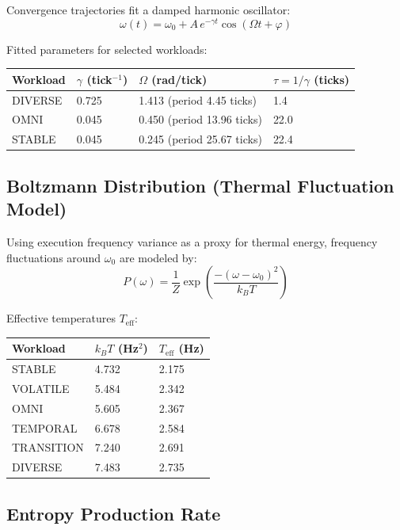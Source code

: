 Convergence trajectories fit a damped harmonic oscillator:
\[
  \omega(t) = \omega_0 + A\,e^{-\gamma t}\cos(\Omega t + \varphi)
\]

Fitted parameters for selected workloads:

\begin{center}
\begin{tabular}{llll}
\toprule
Workload & $\gamma$ (tick$^{-1}$) & $\Omega$ (rad/tick) & $\tau = 1/\gamma$ (ticks) \\
\midrule
DIVERSE & 0.725 & 1.413 (period 4.45 ticks) & 1.4 \\
OMNI    & 0.045 & 0.450 (period 13.96 ticks) & 22.0 \\
STABLE  & 0.045 & 0.245 (period 25.67 ticks) & 22.4 \\
\bottomrule
\end{tabular}
\end{center}

\subsection{Boltzmann Distribution (Thermal Fluctuation Model)}

Using execution frequency variance as a proxy for thermal energy,
frequency fluctuations around $\omega_0$ are modeled by:
\[
  P(\omega) = \frac{1}{Z}\exp\!\left(\frac{-(\omega-\omega_0)^2}{k_B T}\right)
\]

Effective temperatures $T_\text{eff}$:

\begin{center}
\begin{tabular}{lll}
\toprule
Workload    & $k_B T$ (Hz$^2$) & $T_\text{eff}$ (Hz) \\
\midrule
STABLE      & 4.732 & 2.175 \\
VOLATILE    & 5.484 & 2.342 \\
OMNI        & 5.605 & 2.367 \\
TEMPORAL    & 6.678 & 2.584 \\
TRANSITION  & 7.240 & 2.691 \\
DIVERSE     & 7.483 & 2.735 \\
\bottomrule
\end{tabular}
\end{center}

\subsection{Entropy Production Rate}

